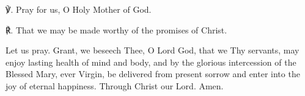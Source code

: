 \begin{enpars}℣. Pray for us, O Holy Mother of God.

℟. That we may be made worthy of the promises of Christ.

Let us pray. Grant, we beseech Thee, O Lord God, that we Thy servants, may enjoy lasting health of mind and body, and by the glorious intercession of the Blessed Mary, ever Virgin, be delivered from present sorrow and enter into the joy of eternal happiness. Through Christ our Lord. Amen. \end{enpars}